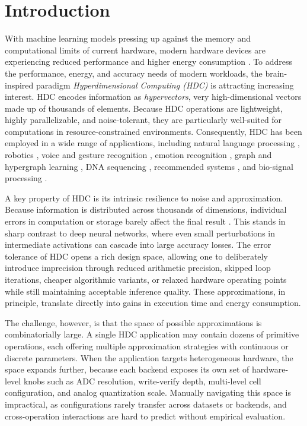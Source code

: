 \section{Introduction}
\label{sec:intro}

With machine learning models pressing up against the memory and computational limits of current hardware, modern hardware devices are experiencing reduced performance and higher energy consumption \cite{hpvm-hdc}. To address the performance, energy, and accuracy needs of modern workloads, the brain-inspired paradigm \textit{Hyperdimensional Computing (HDC)} \cite{kanerva2009hyperdimensional} is attracting increasing interest. HDC encodes information as \textit{hypervectors}, very high-dimensional vectors made up of thousands of elements. Because HDC operations are lightweight, highly parallelizable, and noise-tolerant, they are particularly well-suited for computations in resource-constrained environments. Consequently, HDC has been employed in a wide range of applications, including natural language processing \cite{rahimi2016robust}, robotics \cite{mitrokhin2019learning}, voice and gesture recognition \cite{imani2017voicehd, rahimi2016hyperdimensional}, emotion recognition \cite{chang2019hyperdimensional}, graph and hypergraph learning \cite{nunes2022graphhd, HygHD}, DNA sequencing \cite{kim2020geniehd}, recommended systems \cite{guo2021hyperrec}, and bio-signal processing \cite{asgarinejad2020detection}.

A key property of HDC is its intrinsic resilience to noise and approximation. Because information is distributed across thousands of dimensions, individual errors in computation or storage barely affect the final result \cite{SurveyHDC}. This stands in sharp contrast to deep neural networks, where even small perturbations in intermediate activations can cascade into large accuracy losses. The error tolerance of HDC opens a rich design space, allowing one to deliberately introduce imprecision through reduced arithmetic precision, skipped loop iterations, cheaper algorithmic variants, or relaxed hardware operating points while still maintaining acceptable inference quality. These approximations, in principle, translate directly into gains in execution time and energy consumption.

The challenge, however, is that the space of possible approximations is combinatorially large. A single HDC application may contain dozens of primitive operations, each offering multiple approximation strategies with continuous or discrete parameters. When the application targets heterogeneous hardware, the space expands further, because each backend exposes its own set of hardware-level knobs such as ADC resolution, write-verify depth, multi-level cell configuration, and analog quantization scale. Manually navigating this space is impractical, as configurations rarely transfer across datasets or backends, and cross-operation interactions are hard to predict without empirical evaluation.

